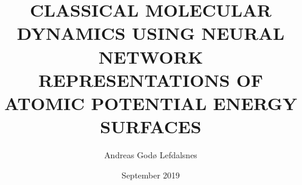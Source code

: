 \documentclass[twoside,english]{uiofysmaster}
\author{Andreas God{\o} Lefdalsnes}
\title{\uppercase{Classical molecular dynamics using neural network
representations of atomic potential energy surfaces}}
\date{September 2019}
\begin{document}
\begin{titlepage}
\maketitle
\end{titlepage}
\end{document}
